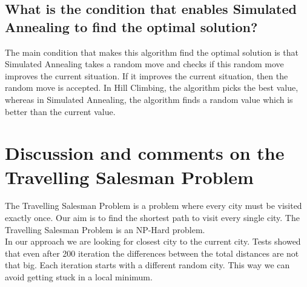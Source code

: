 \documentclass[11pt]{article}
\begin{document}
\subsection{What is the condition that enables Simulated Annealing to find
the optimal solution?}
The main condition that makes this algorithm find the optimal solution is that Simulated Annealing takes a random move and checks if this random move improves the current situation. If it improves the current situation, then the random move is accepted. In Hill Climbing, the algorithm picks the best value, whereas in Simulated Annealing, the algorithm finds a random value which is better than the current value. 

\newpage
\section{Discussion and comments on the Travelling Salesman Problem}
The Travelling Salesman Problem is a problem where every city must be visited exactly once. Our aim is to find the shortest path to visit every single city. The Travelling Salesman Problem is an NP-Hard problem. \\

In our approach we are looking for closest city to the current city. Tests showed that even after 200 iteration the differences between the total distances are not that big. Each iteration starts with a different random city. This way we can avoid getting stuck in a local minimum.
\end{document}

